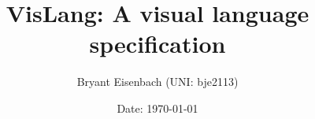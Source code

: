 \documentclass[titlepage]{article}
\title{VisLang: A visual language specification}
\author{Bryant Eisenbach (UNI: bje2113)}
\date{Date: \today}
\begin{document}
\maketitle
\pagebreak

\tableofcontents
\pagebreak

\listoffigures
\pagebreak

\listoftables
\pagebreak

\listoflistings
\pagebreak


\pagebreak


\pagebreak


\pagebreak


\pagebreak


\pagebreak


\pagebreak


\pagebreak


\end{document}
